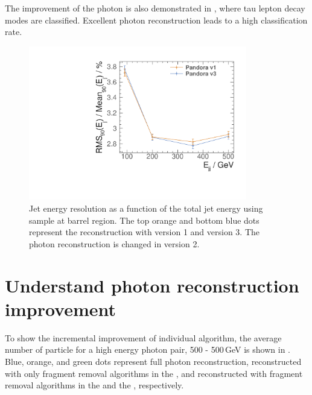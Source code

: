 The improvement of the photon is also demonstrated in , where tau lepton decay modes are classified. Excellent photon reconstruction leads to a high classification rate.

\begin{figure}[tbph]
\centering
\includegraphics[width=0.85\textwidth]{photon/JERnew.pdf}
\caption[Jet energy resolution as a function of the di-jet energy]
{Jet energy resolution as a function of the total jet energy using \Zuds sample at barrel region. The top orange and bottom blue dots represent the  reconstruction with \pandora version 1 and version 3. The photon reconstruction is changed in \pandora version 2.}
\label{fig:photonJER}
\end{figure}


\section{Understand photon reconstruction improvement}





To show the incremental improvement of individual algorithm, the average number of particle for a high energy photon pair, 500 - 500\,GeV is shown in . Blue, orange, and green dots represent full photon reconstruction, reconstructed with only fragment removal algorithms in the \ECAL, and reconstructed with fragment removal algorithms in the \ECAL and the \HCAL, respectively.

